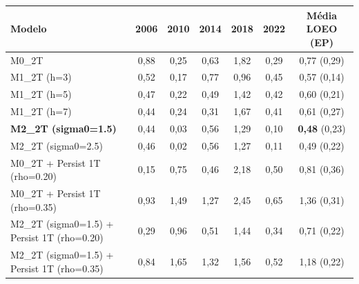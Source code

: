 \begin{tabular}{lcccccc}
\toprule
\textbf{Modelo} & \textbf{2006} & \textbf{2010} & \textbf{2014} & \textbf{2018} & \textbf{2022} & \textbf{Média LOEO (EP)} \\
\midrule
M0\_2T & 0,88 & 0,25 & 0,63 & 1,82 & 0,29 & 0,77 (0,29) \\
M1\_2T (h=3) & 0,52 & 0,17 & 0,77 & 0,96 & 0,45 & 0,57 (0,14) \\
M1\_2T (h=5) & 0,47 & 0,22 & 0,49 & 1,42 & 0,42 & 0,60 (0,21) \\
M1\_2T (h=7) & 0,44 & 0,24 & 0,31 & 1,67 & 0,41 & 0,61 (0,27) \\
\textbf{M2\_2T (sigma0=1.5)} & 0,44 & 0,03 & 0,56 & 1,29 & 0,10 & \textbf{0,48} (0,23) \\
M2\_2T (sigma0=2.5) & 0,46 & 0,02 & 0,56 & 1,27 & 0,11 & 0,49 (0,22) \\
M0\_2T + Persist 1T (rho=0.20) & 0,15 & 0,75 & 0,46 & 2,18 & 0,50 & 0,81 (0,36) \\
M0\_2T + Persist 1T (rho=0.35) & 0,93 & 1,49 & 1,27 & 2,45 & 0,65 & 1,36 (0,31) \\
M2\_2T (sigma0=1.5) + Persist 1T (rho=0.20) & 0,29 & 0,96 & 0,51 & 1,44 & 0,34 & 0,71 (0,22) \\
M2\_2T (sigma0=1.5) + Persist 1T (rho=0.35) & 0,84 & 1,65 & 1,32 & 1,56 & 0,52 & 1,18 (0,22) \\
\bottomrule
\end{tabular}

